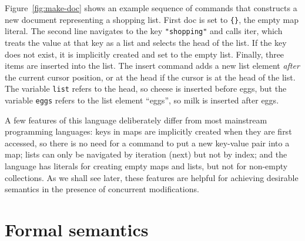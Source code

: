 \documentclass[10pt,journal,compsoc]{IEEEtran}
\begin{document}
Figure~\ref{fig:make-doc} shows an example sequence of commands that constructs a new document representing a shopping list. First \textsf{doc} is set to \verb|{}|, the empty map literal. The second line navigates to the key \verb|"shopping"| and calls \textsf{iter}, which treats the value at that key as a list and selects the head of the list. If the key does not exist, it is implicitly created and set to the empty list. Finally, three items are inserted into the list. The \textsf{insert} command adds a new list element \emph{after} the current cursor position, or at the head if the cursor is at the head of the list. The variable \verb|list| refers to the head, so cheese is inserted before eggs, but the variable \verb|eggs| refers to the list element ``eggs'', so milk is inserted after eggs.

A few features of this language deliberately differ from most mainstream programming languages: keys in maps are implicitly created when they are first accessed, so there is no need for a command to put a new key-value pair into a map; lists can only be navigated by iteration (\textsf{next}) but not by index; and the language has literals for creating empty maps and lists, but not for non-empty collections. As we shall see later, these features are helpful for achieving desirable semantics in the presence of concurrent modifications.

\section{Formal semantics}\label{sec:semantics}
\end{document}
